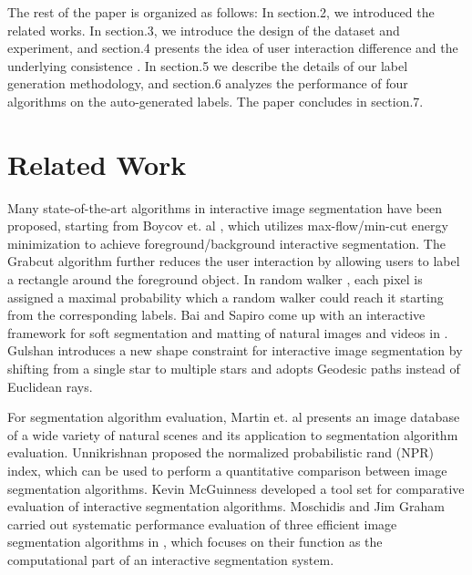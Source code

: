 \documentclass[runningheads,a4paper]{llncs}
\begin{document}
The rest of the paper is organized as follows: In section.2, we introduced the related works. In section.3, we introduce the design of the dataset and experiment, and section.4 presents the idea of user interaction difference and the underlying consistence . In section.5 we describe the details of our label generation methodology, and section.6 analyzes the performance of four algorithms on the auto-generated labels. The paper concludes in section.7.

\section{Related Work}

Many state-of-the-art algorithms in interactive image segmentation have been proposed, starting from Boycov et. al \cite{boykov2001interactive}, which utilizes max-flow/min-cut energy minimization to achieve foreground/background interactive segmentation. The Grabcut algorithm\cite{rother2004grabcut} further reduces the user interaction by allowing users to label a rectangle around the foreground object. In random walker \cite{grady2006random}, each pixel is assigned a maximal probability which a random walker could reach it starting from the corresponding labels. Bai and Sapiro come up with an interactive framework for soft segmentation and matting of natural images and videos in \cite{bai2007geodesic}. Gulshan\cite{gulshan2010geodesic} introduces a new shape constraint for interactive image segmentation by shifting from a single star to multiple stars and adopts Geodesic paths instead of Euclidean rays.

For segmentation algorithm evaluation, Martin et. al  \cite{martin2001database} presents an image database of a wide variety of natural scenes and its application to segmentation algorithm evaluation.  Unnikrishnan \cite{unnikrishnan2007toward} proposed the normalized probabilistic rand (NPR) index, which can be used to perform a quantitative comparison between image segmentation algorithms. Kevin McGuinness \cite{mcguinness2010comparative} developed a tool set for comparative evaluation of interactive segmentation algorithms. Moschidis and Jim Graham carried out systematic performance evaluation of three efficient image segmentation algorithms in \cite{moschidis2010systematic}, which focuses on their function as the computational part of an interactive segmentation system.
\end{document}
